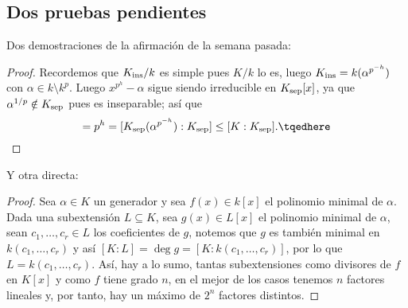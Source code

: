 \documentclass[11pt, reqno]{amsart}
\begin{document}
\begin{additional}
\section{Dos pruebas pendientes}
Dos demostraciones de la afirmación de la semana pasada:
\begin{proof}
	Recordemos que $K_{\rm ins}/k$ es simple pues $K/k$ lo es, luego $K_{\rm ins} = k(\alpha^{p^{-h}})$ con $\alpha \in k \setminus k^p$.
	Luego $x^{p^h} - \alpha$ sigue siendo irreducible en $K_{\rm sep}[x]$, ya que $\alpha^{1/p} \notin K_{\rm sep}$ pues es inseparable;
	así que
	\begin{equation}
		[K_{\rm ins} : k] = p^h = [K_{\rm sep}(\alpha^{p^{-h}}) : K_{\rm sep}] \le [K : K_{\rm sep}].
		\tqedhere
	\end{equation}
\end{proof}
Y otra directa:
\begin{proof}
	Sea $\alpha \in K$ un generador y sea $f(x) \in k[x]$ el polinomio minimal de $\alpha$.
	Dada una subextensión $L \subseteq K$, sea $g(x) \in L[x]$ el polinomio minimal de $\alpha$, sean $c_1, \dots, c_r \in L$ los
	coeficientes de $g$, notemos que $g$ es también minimal en $k(c_1, \dots, c_r)$ y así $[K : L] = \deg g = [K : k(c_1, \dots, c_r)]$,
	por lo que $L = k(c_1, \dots, c_r)$.
	Así, hay a lo sumo, tantas subextensiones como divisores de $f$ en $K[x]$ y como $f$ tiene grado $n$, en el mejor de los casos
	tenemos $n$ factores lineales y, por tanto, hay un máximo de $2^n$ factores distintos.
\end{proof}

\printbibliography
\end{additional}
\end{document}
